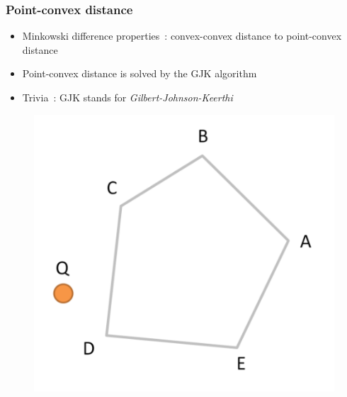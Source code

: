 \documentclass{beamer}
\begin{document}
\begin{frame}
  \frametitle{Point-convex distance}
  \begin{minipage}{0.6\linewidth}
    \begin{itemize}
    \item Minkowski difference properties~: convex-convex distance to point-convex distance
    \item Point-convex distance is solved by the GJK algorithm
    \item Trivia~: GJK stands for \emph{Gilbert-Johnson-Keerthi}
    \end{itemize}
  \end{minipage}
  \hfill
  \begin{minipage}{0.38\linewidth}
    \begin{figure}[p]
      \centering
      \includegraphics[width=0.9\linewidth]{gjk}
    \end{figure}
  \end{minipage}
\end{frame}
\end{document}

